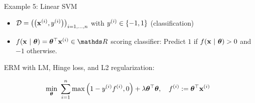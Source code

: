\documentclass[11pt,compress,t,notes=noshow, xcolor=table]{beamer}
\begin{document}
\begin{vbframe}{Example 5: Linear SVM}

\begin{footnotesize}
\begin{itemize}
	\item $\mathcal{D} = \left(\left(\mathbf{x}^{(i)}, y^{(i)}\right)\right)_{i = 1, ..., n}$ with $y^{(i)} \in \{-1, 1\}$ (classification)
	\item $\fxt = \thetab^\top \xi \in \R$ scoring classifier: Predict $1$ if $f(\mathbf{x} ~|~ \bm{\theta}) > 0$ and $-1$ otherwise. 
\end{itemize}
\end{footnotesize}

ERM with LM, Hinge loss, and L2 regularization: 

$$
	\min_{\bm{\theta}} ~\sum\limits_{i=1}^n \max\left(1 - y^{(i)} f^{(i)}, 0\right) + \lambda \bm{\theta}^\top \bm{\theta}, \quad f^{(i)} := \bm{\theta}^\top \mathbf{x}^{(i)}
$$

\vspace*{-0.2cm}


\end{vbframe}
\end{document}
